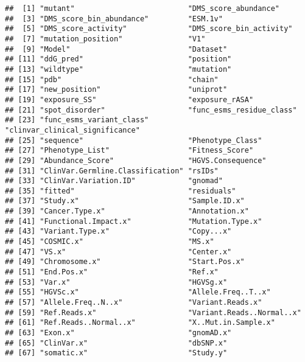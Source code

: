 \documentclass[
]{article}
\begin{document}
\begin{verbatim}
##  [1] "mutant"                          "DMS_score_abundance"            
##  [3] "DMS_score_bin_abundance"         "ESM.1v"                         
##  [5] "DMS_score_activity"              "DMS_score_bin_activity"         
##  [7] "mutation_position"               "V1"                             
##  [9] "Model"                           "Dataset"                        
## [11] "ddG_pred"                        "position"                       
## [13] "wildtype"                        "mutation"                       
## [15] "pdb"                             "chain"                          
## [17] "new_position"                    "uniprot"                        
## [19] "exposure_SS"                     "exposure_rASA"                  
## [21] "spot_disorder"                   "func_esms_residue_class"        
## [23] "func_esms_variant_class"         "clinvar_clinical_significance"  
## [25] "sequence"                        "Phenotype_Class"                
## [27] "Phenotype_List"                  "Fitness_Score"                  
## [29] "Abundance_Score"                 "HGVS.Consequence"               
## [31] "ClinVar.Germline.Classification" "rsIDs"                          
## [33] "ClinVar.Variation.ID"            "gnomad"                         
## [35] "fitted"                          "residuals"                      
## [37] "Study.x"                         "Sample.ID.x"                    
## [39] "Cancer.Type.x"                   "Annotation.x"                   
## [41] "Functional.Impact.x"             "Mutation.Type.x"                
## [43] "Variant.Type.x"                  "Copy...x"                       
## [45] "COSMIC.x"                        "MS.x"                           
## [47] "VS.x"                            "Center.x"                       
## [49] "Chromosome.x"                    "Start.Pos.x"                    
## [51] "End.Pos.x"                       "Ref.x"                          
## [53] "Var.x"                           "HGVSg.x"                        
## [55] "HGVSc.x"                         "Allele.Freq..T..x"              
## [57] "Allele.Freq..N..x"               "Variant.Reads.x"                
## [59] "Ref.Reads.x"                     "Variant.Reads..Normal..x"       
## [61] "Ref.Reads..Normal..x"            "X..Mut.in.Sample.x"             
## [63] "Exon.x"                          "gnomAD.x"                       
## [65] "ClinVar.x"                       "dbSNP.x"                        
## [67] "somatic.x"                       "Study.y"                        

\end{verbatim}
\end{document}
